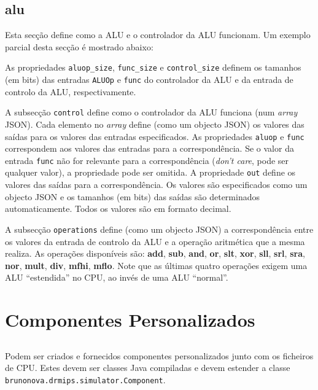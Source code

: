 \documentclass[11pt,a4paper,twoside,titlepage]{report}
\begin{document}
\section{alu}

Esta secção define como a ALU e o controlador da ALU funcionam.
Um exemplo parcial desta secção é mostrado abaixo:



As propriedades \verb+aluop_size+, \verb+func_size+ e \verb+control_size+
definem os tamanhos (em bits) das entradas \verb+ALUOp+ e \verb+func+ do
controlador da ALU e da entrada de controlo da ALU, respectivamente.

A subsecção \verb+control+ define como o controlador da ALU funciona (num
\emph{array} JSON).
Cada elemento no \emph{array} define (como um objecto JSON) os valores
das saídas para os valores das entradas especificados.
As propriedades \verb+aluop+ e \verb+func+ correspondem aos valores das
entradas para a correspondência. Se o valor da entrada \verb+func+ não for
relevante para a correspondência (\emph{don't care}, pode ser qualquer valor),
a propriedade pode ser omitida.
A propriedade \verb+out+ define os valores das saídas para a correspondência.
Os valores são especificados como um objecto JSON e os tamanhos (em bits) das
saídas são determinados automaticamente.
Todos os valores são em formato decimal.

A subsecção \verb+operations+ define (como um objecto JSON) a correspondência
entre os valores da entrada de controlo da ALU e a operação aritmética que a
mesma realiza.
As operações disponíveis são: \textbf{add}, \textbf{sub}, \textbf{and}, \textbf{or},
\textbf{slt}, \textbf{xor}, \textbf{sll}, \textbf{srl}, \textbf{sra}, \textbf{nor},
\textbf{mult}, \textbf{div}, \textbf{mfhi}, \textbf{mflo}.
Note que as últimas quatro operações exigem uma ALU ``estendida'' no CPU, ao
invés de uma ALU ``normal''.


\chapter{Componentes Personalizados} \label{ch:custom_comps}

\section*{}

Podem ser criados e fornecidos componentes personalizados junto com os
ficheiros de CPU.
Estes devem ser classes Java compiladas e devem estender a classe
\verb+brunonova.drmips.simulator.Component+.
\end{document}
